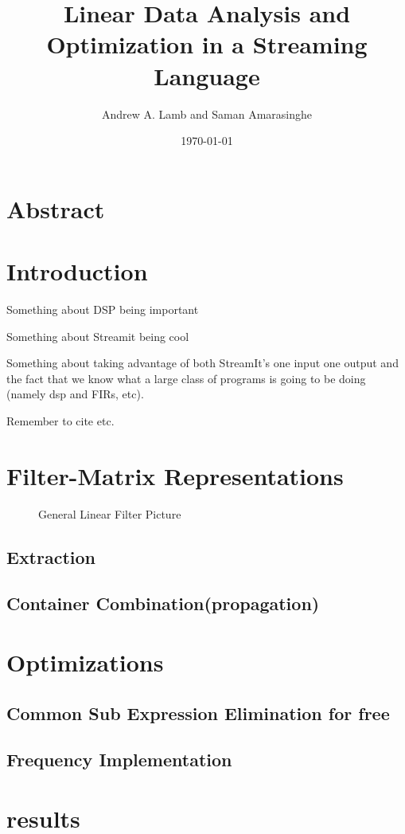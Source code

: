 \documentclass{article}
\title{Linear Data Analysis and Optimization in a Streaming Language}
\author{Andrew A. Lamb and Saman Amarasinghe}
\date{\today}
\begin{document}
\maketitle
\clearpage

\section{Abstract}


\section{Introduction}
Something about DSP being important

Something about Streamit being cool

Something about taking advantage of both StreamIt's one input one output and 
the fact that we know what a large class of programs is going to be doing 
(namely dsp and FIRs, etc).

Remember to cite \cite{xiong-thesis,xiong01spl,johnson01searching,egner01automatic} etc.


\section{Filter-Matrix Representations}
\begin{figure}
\center
\epsfxsize=4.5in
\caption{General Linear Filter Picture}
\label{fig:overview}
\end{figure}

\subsection{Extraction}
\subsection{Container Combination(propagation)}

\section{Optimizations}
\subsection{Common Sub Expression Elimination for free}
\subsection{Frequency Implementation}

\section{results}



\begin{small}
\begin{singlespace}


\end{singlespace}
\end{small}
\end{document}
